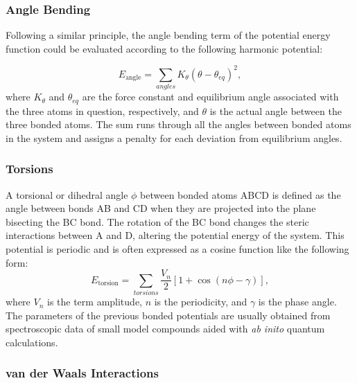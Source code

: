 \documentclass[11pt]{report}
\begin{document}
\subsubsection{Angle Bending}

Following a similar principle,
the angle bending term of the
potential energy function could be 
evaluated according to the following harmonic potential:

\begin{equation}
E_\text{angle} = \sum_{angles} K_{\theta}
\left(\theta - \theta_{eq} \right)^2,
\end{equation}
where $K_{\theta}$ and $\theta_{eq}$
are the force constant and 
equilibrium angle associated with 
the three atoms in question, respectively, and $\theta$ is the actual
angle between the three bonded atoms. The sum runs through 
all the angles between bonded atoms
in the system and assigns a penalty for each deviation from equilibrium
angles.

\subsubsection{Torsions}

A torsional or dihedral angle $\phi$ between bonded atoms
ABCD is defined as the angle between bonds
AB and CD when they are projected into the
plane bisecting the BC bond. The rotation
of the BC bond changes the steric interactions
between A and D, altering the potential energy
of the system. This potential is periodic
and is often expressed as a cosine function
like the following form:
\begin{equation}
E_\text{torsion} = \sum_{torsions} \frac{V_{n}}{2}
\left[1+\cos(n\phi-\gamma)\right],
\end{equation}
where $V_n$ is the term amplitude, $n$ is the
periodicity, and $\gamma$ is the phase angle.
The parameters of the previous bonded potentials are usually
obtained from spectroscopic data of small
model compounds aided with \emph{ab inito} quantum
calculations.

\subsubsection{van der Waals Interactions}
\end{document}
